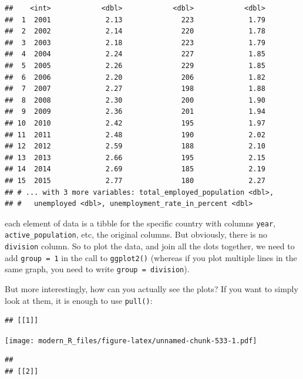 \documentclass[]{gitbook}
\newenvironment{Shaded}{\begin{snugshade}}{\end{snugshade}}
\newcommand{\KeywordTok}[1]{\textcolor[rgb]{0.13,0.29,0.53}{\textbf{#1}}}
\newcommand{\NormalTok}[1]{#1}
\newcommand{\OperatorTok}[1]{\textcolor[rgb]{0.81,0.36,0.00}{\textbf{#1}}}
\newcommand{\StringTok}[1]{\textcolor[rgb]{0.31,0.60,0.02}{#1}}
\theoremstyle{definition}
\theoremstyle{definition}
\theoremstyle{definition}
\theoremstyle{remark}
\begin{document}
\begin{verbatim}
##    <int>            <dbl>            <dbl>            <dbl>
##  1  2001             2.13              223             1.79
##  2  2002             2.14              220             1.78
##  3  2003             2.18              223             1.79
##  4  2004             2.24              227             1.85
##  5  2005             2.26              229             1.85
##  6  2006             2.20              206             1.82
##  7  2007             2.27              198             1.88
##  8  2008             2.30              200             1.90
##  9  2009             2.36              201             1.94
## 10  2010             2.42              195             1.97
## 11  2011             2.48              190             2.02
## 12  2012             2.59              188             2.10
## 13  2013             2.66              195             2.15
## 14  2014             2.69              185             2.19
## 15  2015             2.77              180             2.27
## # ... with 3 more variables: total_employed_population <dbl>,
## #   unemployed <dbl>, unemployment_rate_in_percent <dbl>
\end{verbatim}

each element of data is a tibble for the specific country with columns
\texttt{year}, \texttt{active\_population}, etc, the original columns.
But obviously, there is no \texttt{division} column. So to plot the
data, and join all the dots together, we need to add
\texttt{group\ =\ 1} in the call to \texttt{ggplot2()} (whereas if you
plot multiple lines in the same graph, you need to write
\texttt{group\ =\ division}).

But more interestingly, how can you actually see the plots? If you want
to simply look at them, it is enough to use \texttt{pull()}:

\begin{Shaded}
\end{Shaded}

\begin{verbatim}
## [[1]]
\end{verbatim}

\texttt{[image: modern\_R\_files/figure-latex/unnamed-chunk-533-1.pdf]}

\begin{verbatim}
## 
## [[2]]
\end{verbatim}
\end{document}
